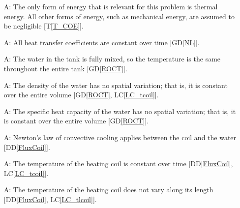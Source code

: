 \documentclass[12pt]{article}
\newcommand{\dref}[1]{GD\ref{#1}}
\newcommand{\ddref}[1]{DD\ref{#1}}
\newcommand{\tref}[1]{T\ref{#1}}
\newcounter{assumpnum} %
\newcommand{\lcref}[1]{LC\ref{#1}}
\begin{document}
\begin{itemize}

\item[A\refstepcounter{assumpnum}\theassumpnum \label{A_OnlyThermalEnergy}:] The
  only form of energy that is relevant for this problem is thermal energy.  All
  other forms of energy, such as mechanical energy, are assumed to be
  negligible [\tref{T_COE}].

\item[A\refstepcounter{assumpnum}\theassumpnum \label{A_hcoeff}:] All heat
  transfer coefficients are constant over time [\dref{NL}].

\item[A\refstepcounter{assumpnum}\theassumpnum \label{A_mixed}:] The water in
  the tank is fully mixed, so the temperature is the same throughout the entire
  tank [\dref{ROCT}].%


\item[A\refstepcounter{assumpnum}\theassumpnum \label{A_const_density}:] The density
  of the water
has no spatial variation; that is, it is
  constant over the entire volume [\dref{ROCT}, \lcref{LC_tcoil}].

\item[A\refstepcounter{assumpnum}\theassumpnum \label{A_const_C}:] The specific heat
  capacity of the water 
has no spatial variation; that is, it is
 constant over the entire volume [\dref{ROCT}].

\item[A\refstepcounter{assumpnum}\theassumpnum \label{A_Newt_coil}:] Newton's
  law of convective cooling applies between the coil and the water [\ddref{FluxCoil}].
	
\item[A\refstepcounter{assumpnum}\theassumpnum \label{A_tcoil}:] The temperature
  of the heating coil is constant over time [\ddref{FluxCoil}, \lcref{LC_tcoil}].
	
\item[A\refstepcounter{assumpnum}\theassumpnum \label{A_tlcoil}:] The
  temperature of the heating coil does not vary along its
  length [\ddref{FluxCoil}, \lcref{LC_tlcoil}].



\end{itemize}
\end{document}
